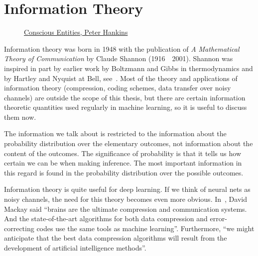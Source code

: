\section{Information Theory}%
\label{sec:information-theory}

\vspace{1cm}

\begin{figure}[h!]%
  \label{fig:info}
  \centering
  \caption{\href{https://www.consciousentities.com/2017/02/consciousness-entropy/}{Conscious
      Entities, Peter Hankins}}
\end{figure}

\vspace{1cm}

\noindent Information theory was born in 1948 with the publication of \textit{A
  Mathematical Theory of Communication} by Claude Shannon
(1916~\textendash~2001). Shannon was inspired in part by earlier work by
Boltzmann and Gibbs in thermodynamics and by Hartley and Nyquist at Bell,
see~\cite{ref:losee-1997}. Most of the theory and applications of information
theory (compression, coding schemes, data transfer over noisy channels) are
outside the scope of this thesis, but there are certain information theoretic
quantities used regularly in machine learning, so it is useful to discuss them
now.

\begin{remark}
  The information we talk about is restricted to the information about the
  probability distribution over the elementary outcomes, not information about
  the content of the outcomes. The significance of probability is that it tells
  us how certain we can be when making inference. The most important information
  in this regard is found in the probability distribution over the possible
  outcomes.
\end{remark}

Information theory is quite useful for deep learning. If we think of neural nets
as noisy channels, the need for this theory becomes even more obvious.
In~\cite{ref:mackay-2003}, David Mackay said ``brains are the ultimate
compression and communication systems. And the state-of-the-art algorithms for
both data compression and error-correcting codes use the same tools as machine
learning''. Furthermore, ``we might anticipate that the best data compression
algorithms will result from the development of artificial intelligence
methods''.

